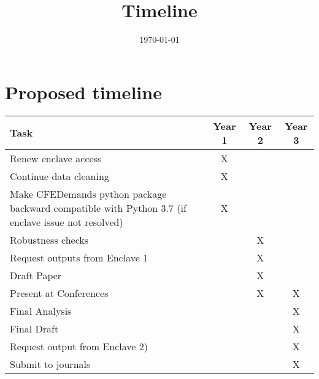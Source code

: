 \documentclass[11pt]{article}
\date{\today}
\title{Timeline}
\begin{document}
\maketitle
\section{Proposed timeline}
\label{sec:orgb0daf76}
\begin{center}
\begin{tabular}{p{} c c c}
Task & Year 1 & Year 2 & Year 3\\
\hline
Renew enclave access & X &  & \\
\hline
Continue data cleaning & X &  & \\
\hline
Make CFEDemands python package backward compatible with Python 3.7 (if enclave issue not resolved) & X &  & \\
\hline
Robustness checks &  & X & \\
\hline
Request outputs from Enclave 1 &  & X & \\
\hline
Draft Paper &  & X & \\
\hline
Present at Conferences &  & X & X\\
\hline
Final Analysis &  &  & X\\
\hline
Final Draft &  &  & X\\
\hline
Request output from Enclave 2) &  &  & X\\
\hline
Submit to journals &  &  & X\\
\hline
\end{tabular}
\end{center}
\end{document}
